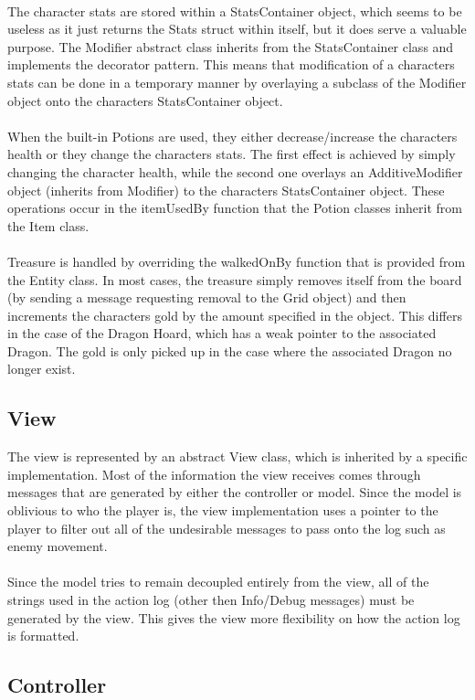 \documentclass[12pt]{article}
\begin{document}
\\
The character stats are stored within a StatsContainer object, which seems to be useless as it just returns the Stats struct within itself, but it does serve a valuable purpose. The Modifier abstract class inherits from the StatsContainer class and implements the decorator pattern. This means that modification of a characters stats can be done in a temporary manner by overlaying a subclass of the Modifier object onto the characters StatsContainer object. \\
\\
When the built-in Potions are used, they either decrease/increase the characters health or they change the characters stats. The first effect is achieved by simply changing the character health, while the second one overlays an AdditiveModifier object (inherits from Modifier) to the characters StatsContainer object. These operations occur in the itemUsedBy function that the Potion classes inherit from the Item class. \\
\\
Treasure is handled by overriding the walkedOnBy function that is provided from the Entity class. In most cases, the treasure simply removes itself from the board (by sending a message requesting removal to the Grid object) and then increments the characters gold by the amount specified in the object. This differs in the case of the Dragon Hoard, which has a weak pointer to the associated Dragon. The gold is only picked up in the case where the associated Dragon no longer exist.
\subsection*{View}

The view is represented by an abstract View class, which is inherited by a specific implementation. Most of the information the view receives comes through messages that are generated by either the controller or model. Since the model is oblivious to who the player is, the view implementation uses a pointer to the player to filter out all of the undesirable messages to pass onto the log such as enemy movement.\\
\\
Since the model tries to remain decoupled entirely from the view, all of the strings used in the action log (other then Info/Debug messages) must be generated by the view. This gives the view more flexibility on how the action log is formatted.

\subsection*{Controller}
\end{document}
